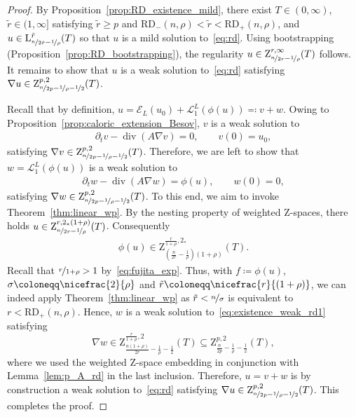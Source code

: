 \documentclass[11pt, leqno]{amsart}
\theoremstyle{definition}
\renewcommand{\L}{\mathrm{L}}
\newcommand{\Z}{\mathrm{Z}}
\newcommand{\Ext}{\mathcal{E}}
\newcommand{\Soll}{\mathcal{L}}
\DeclareMathOperator{\Div}{div}
\newcommand{\RD}{\mathrm{RD}}
\begin{document}
	\begin{proof}
		By Proposition~\ref{prop:RD_existence_mild}, there exist $T\in (0,\infty)$, $\tilde r \in (1,\infty]$ satisfying $\tilde r \geq p$ and $\RD_{-}(n,\rho) < \tilde r < \RD_{+}(n,\rho)$, and $u \in \L^{\tilde r}_{\nicefrac{n}{2\tilde{r}} - \nicefrac{1}{\rho}}(T)$ so that $u$ is a mild solution to~\eqref{eq:rd}. Using bootstrapping (Proposition~\ref{prop:RD_bootstrapping}), the regularity $u\in \Z^{r,\infty}_{\nicefrac{n}{2r} - \nicefrac{1}{\rho}}(T)$ follows.
		It remains to show that $u$ is a weak solution to~\eqref{eq:rd} satisfying $\nabla u \in \Z^{p,2}_{\nicefrac{n}{2p} - \nicefrac{1}{\rho} - \nicefrac{1}{2}}(T)$.

		Recall that by definition, $u = \Ext_L(u_0) + \Soll^L_1(\phi(u)) \eqqcolon v + w$. Owing to Proposition~\ref{prop:caloric_extension_Besov}, $v$ is a weak solution to
		\begin{align}
			\partial_t v - \Div(A\nabla v) = 0, \qquad v(0) = u_0,
		\end{align}
		satisfying $\nabla v\in \Z^{p,2}_{\nicefrac{n}{2p} - \nicefrac{1}{\rho} - \nicefrac{1}{2}}(T)$. Therefore, we are left to show that $w = \Soll^L_1(\phi(u))$ is a weak solution to
		\begin{align}
			\label{eq:existence_weak_rd1}
			\partial_t w - \Div(A\nabla w) = \phi(u), \qquad w(0) = 0,
		\end{align}
		satisfying $\nabla w \in \Z^{p,2}_{\nicefrac{n}{2p} - \nicefrac{1}{\rho} - \nicefrac{1}{2}}(T)$.
		To this end, we aim to invoke Theorem~\ref{thm:linear_wp}.
		By the nesting property of weighted $\Z$-spaces, there holds $u \in \Z^{r, 2_*(1+\rho)}_{\nicefrac{n}{2r} - \nicefrac{1}{\rho}}(T)$. Consequently
		\begin{align}
		\label{eq:bootstrapphiu}
\phi(u) \in \Z^{\frac{r}{1+\rho},2_*}_{(\frac{n}{2r} - \frac{1}{\rho})(1+\rho)}(T).
\end{align}
		Recall that $\nicefrac{r}{1+\rho} > 1$ by~\eqref{eq:fujita_exp}.
		Thus, with $f \coloneqq \phi(u)$, $\sigma \coloneqq \nicefrac{2}{\rho}$ and $\tilde r \coloneqq \nicefrac{r}{(1+\rho)}$, we can indeed apply Theorem~\ref{thm:linear_wp} as $\tilde r < \nicefrac{n}{\sigma}$ is equivalent to $r < \RD_{+}(n,\rho)$.
		Hence, $w$ is a weak solution to~\eqref{eq:existence_weak_rd1} satisfying $$\nabla w \in \Z^{\frac{r}{1+\rho},2}_{\frac{n(1+\rho)}{2r} - \frac{1}{\rho} - \frac{1}{2}}(T) \subseteq {\Z^{p,2}_{\frac{n}{2p} - \frac{1}{\rho} - \frac{1}{2}}(T),}$$
		where we used the weighted $\Z$-space embedding in conjunction with Lemma~\ref{lem:p_A_rd} in the last inclusion.
		Therefore, $u = v + w$ is by construction a weak solution to~\eqref{eq:rd} satisfying $\nabla u \in {\Z^{p,2}_{\nicefrac{n}{2p} - \nicefrac{1}{\rho} - \nicefrac{1}{2}}(T)}$. This completes the proof.
	\end{proof}
\end{document}
